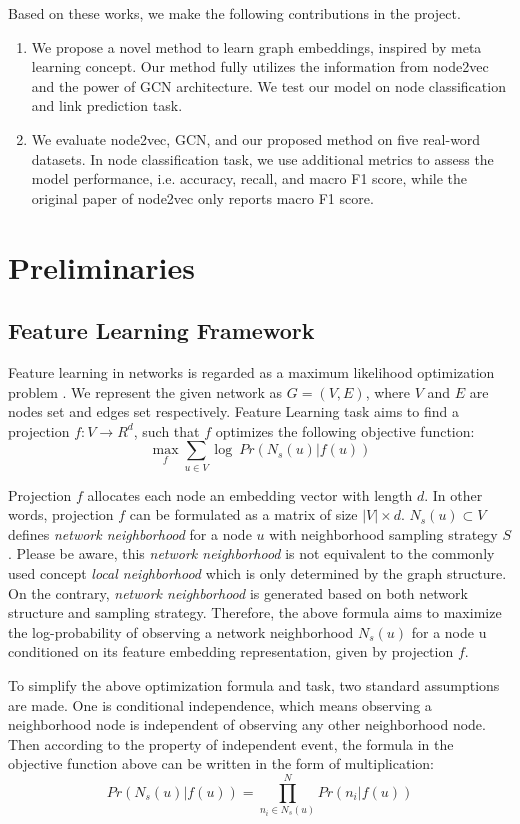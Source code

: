 \documentclass[sigconf]{acmart}
\begin{document}
Based on these works, we make the following contributions in the project.
\begin{enumerate}
    \item We propose a novel method to learn graph embeddings, inspired by meta learning concept. Our method fully utilizes the information from node2vec and the power of GCN architecture. We test our model on node classification and link prediction task.
    \item We evaluate node2vec, GCN, and our proposed method on five real-word datasets. In node classification task, we use additional metrics to assess the model performance, i.e. accuracy, recall, and macro F1 score, while the original paper of node2vec only reports macro F1 score.
\end{enumerate}

\section{Preliminaries}
\subsection{Feature Learning Framework}
Feature learning in networks is regarded as a maximum likelihood optimization problem \cite{node2vec}. We represent the given network as $G=(V,E)$, where $V$ and $E$ are nodes set and edges set respectively. Feature Learning task aims to find a projection $f: V \rightarrow R^d$, such that $f$ optimizes the following objective function:
$$\mathop{max}\limits_{f} \sum_{u\in V}\log\ Pr(N_s(u)|f(u))$$

Projection $f$ allocates each node an embedding vector with length $d$. In other words, projection $f$ can be formulated as a matrix of size $|V|\times d$. $N_s(u)\subset V$ defines \textit{network neighborhood} for a node $u$ with neighborhood sampling strategy $S$. Please be aware, this \textit{network neighborhood} is not equivalent to the commonly used concept \textit{local neighborhood} which is only determined by the graph structure. On the contrary, \textit{network neighborhood} is generated based on both network structure and sampling strategy. Therefore, the above formula aims to maximize the log-probability of observing a network neighborhood $N_s(u)$ for a node u conditioned on its feature embedding representation, given by projection $f$.

To simplify the above optimization formula and task, two standard assumptions are made. One is conditional independence, which means observing a neighborhood node is independent of observing any other neighborhood node. Then according to the property of independent event, the formula in the objective function above can be written in the form of multiplication:
$$Pr(N_s(u)|f(u))=\prod_{n_i\in N_s(u)}^N Pr(n_i|f(u))$$
\end{document}
